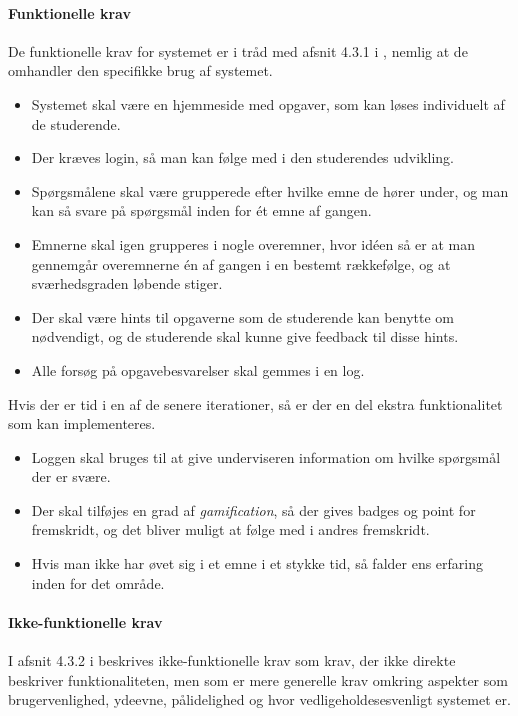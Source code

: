 \documentclass[11pt, a4paper]{article}
\begin{document}
\paragraph{Funktionelle krav}
De funktionelle krav for systemet er i tråd med afsnit 4.3.1 i \cite{OOSE}, nemlig at de omhandler den specifikke brug af systemet.
\begin{itemize}
    \item Systemet skal være en hjemmeside med opgaver, som kan løses individuelt af de studerende.
    \item Der kræves login, så man kan følge med i den studerendes udvikling.
    \item Spørgsmålene skal være grupperede efter hvilke emne de hører under, og man kan så svare på spørgsmål inden for ét emne af gangen.
    \item Emnerne skal igen grupperes i nogle overemner, hvor idéen så er at man gennemgår overemnerne én af gangen i en bestemt rækkefølge, og at sværhedsgraden løbende stiger.
    \item Der skal være hints til opgaverne som de studerende kan benytte om nødvendigt, og de studerende skal kunne give feedback til disse hints.
    \item Alle forsøg på opgavebesvarelser skal gemmes i en log.
\end{itemize}

Hvis der er tid i en af de senere iterationer, så er der en del ekstra funktionalitet som kan implementeres.
\begin{itemize}
    \item Loggen skal bruges til at give underviseren information om hvilke spørgsmål der er svære.
    \item Der skal tilføjes en grad af \emph{gamification}, så der gives badges og point for fremskridt, og det bliver muligt at følge med i andres fremskridt.
    \item Hvis man ikke har øvet sig i et emne i et stykke tid, så falder ens erfaring inden for det område.
\end{itemize}

\paragraph{Ikke-funktionelle krav}
\label{par:ikke_funktionelle_krav}
I afsnit 4.3.2 i \cite{OOSE} beskrives ikke-funktionelle krav som krav, der ikke direkte beskriver funktionaliteten, men som er mere generelle krav omkring aspekter som brugervenlighed, ydeevne, pålidelighed og hvor vedligeholdesesvenligt systemet er.
\end{document}
